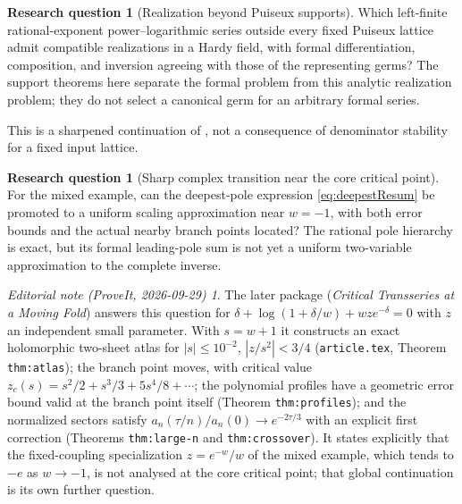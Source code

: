 \documentclass[11pt,a4paper]{article}
\theoremstyle{definition}
\newtheorem{question}[theorem]{Research question}
\theoremstyle{remark}
\newtheorem*{ednote}{Editorial note (ProveIt, 2026-09-29)}
\newcommand{\repoLabel}[1]{\texttt{\detokenize{#1}}}
\begin{document}
\begin{question}[Realization beyond Puiseux supports]
Which left-finite rational-exponent power--logarithmic series outside every
fixed Puiseux lattice admit compatible realizations in a Hardy field, with
formal differentiation, composition, and inversion agreeing with those of
the representing germs? The support theorems here separate the formal
problem from this analytic realization problem; they do not select a
canonical germ for an arbitrary formal series.
\end{question}
This is a sharpened continuation of
\repoLabel{plt:rmk:ext-open-realization}, not a consequence of denominator
stability for a fixed input lattice.

\begin{question}[Sharp complex transition near the core critical point]
For the mixed example, can the deepest-pole expression
\eqref{eq:deepestResum} be promoted to a uniform scaling approximation near
$w=-1$, with both error bounds and the actual nearby branch points located?
The rational pole hierarchy is exact, but its formal leading-pole sum is not
yet a uniform two-variable approximation to the complete inverse.
\end{question}
\begin{ednote}\label{ed:critical-transition}
The later package
(\textit{Critical Transseries at a Moving Fold}) answers this question for
$\delta+\log(1+\delta/w)+wze^{-\delta}=0$ with $z$ an independent small
parameter. With $s=w+1$ it constructs an exact holomorphic two-sheet atlas
for $|s|\le10^{-2}$, $|z/s^2|<3/4$ (\texttt{article.tex}, Theorem
\texttt{thm:atlas}); the branch point moves, with critical value
$z_c(s)=s^2/2+s^3/3+5s^4/8+\cdots$; the polynomial profiles have a
geometric error bound valid at the branch point itself (Theorem
\texttt{thm:profiles}); and the normalized sectors satisfy
$a_n(\tau/n)/a_n(0)\to e^{-2\tau/3}$ with an explicit first correction
(Theorems \texttt{thm:large-n} and \texttt{thm:crossover}). It states
explicitly that the fixed-coupling specialization $z=e^{-w}/w$ of the
mixed example, which tends to $-e$ as $w\to-1$, is not analysed at the
core critical point; that global continuation is its own further question.
\end{ednote}
\end{document}
